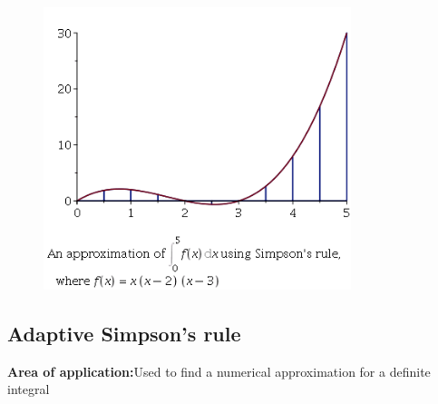 \documentclass{article}
\begin{document}
\begin{figure}[H]
	\includegraphics[width=0.8\textwidth, height=0.6\textwidth]{simp.png}
\end{figure}
	\subsection{Adaptive Simpson's rule}
{\bf Area of application:}Used to find a numerical approximation for a definite integral
\end{document}
